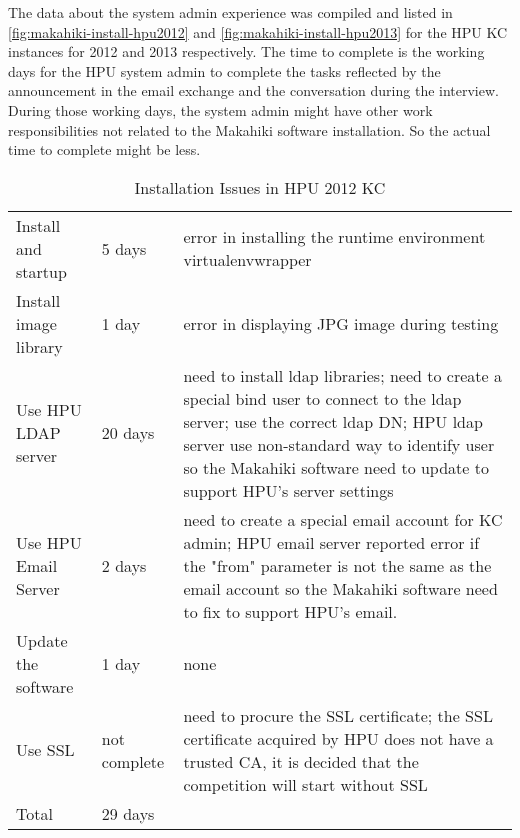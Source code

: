 The data about the system admin experience was compiled and listed in \autoref{fig:makahiki-install-hpu2012} and \autoref{fig:makahiki-install-hpu2013} for the HPU KC instances for 2012 and 2013 respectively. The time to complete is the working days for the HPU system admin to complete the tasks reflected by the announcement in the email exchange and the conversation during the interview. During those working days, the system admin might have other work responsibilities not related to the Makahiki software installation. So the actual time to complete might be less.

\begin{table}[ht!]
  \centering
  \begin{tabular}{|P{0.28\columnwidth}|P{0.1\columnwidth}|p{0.5\columnwidth}|}
    \hline
      &
      &
      \\
    \hline
     Install and startup & 5 days & error in installing the runtime environment virtualenvwrapper\\
    \hline
    Install image library & 1 day & error in displaying JPG image during testing \\
    \hline
     Use HPU LDAP server &  20 days &  need to install ldap libraries; need to create a special bind user to connect to the ldap server; use the correct ldap DN; HPU ldap server use non-standard way to identify user so the Makahiki software need to update to support HPU's server settings \\
    \hline
    Use HPU Email Server & 2 days & need to create a special email account for KC admin;  HPU email server reported error if the "from" parameter is not the same as the email account so the Makahiki software need to fix to support HPU's email. \\
    \hline
    Update the software & 1 day & none \\
    \hline
    Use SSL & not complete & need to procure the SSL certificate; the SSL certificate acquired by HPU does not have a trusted CA, it is decided that the competition will start without SSL \\
    \hline
    Total & 29 days & \\
    \hline
  \end{tabular}
  \caption{Installation Issues in HPU 2012 KC }
  \label{fig:makahiki-install-hpu2012}
\end{table}

